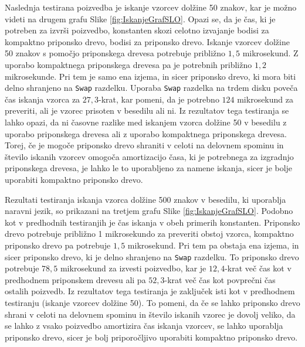 Naslednja testirana poizvedba je iskanje vzorcev dolžine 50 znakov, kar je možno videti na drugem grafu Slike \ref{fig:IskanjeGrafSLO}. Opazi se, da je čas, ki je potreben za izvrši poizvedbo, konstanten skozi celotno izvajanje bodisi za kompaktno priponsko drevo, bodisi za priponsko drevo. Iskanje vzorcev dolžine 50 znakov s pomočjo priponskega drevesa potrebuje približno $1,5$ mikrosekund. Z uporabo kompaktnega priponskega drevesa pa je potrebnih približno $1,2$ mikrosekunde. Pri tem je samo ena izjema, in sicer priponsko drevo, ki mora biti delno shranjeno na \verb|Swap| razdelku. Uporaba \verb|Swap| razdelka na trdem disku poveča čas iskanja vzorca za $27,3$-krat, kar pomeni, da je potrebno $124$ mikrosekund za preveriti, ali je vzorec prisoten v besedilu ali ni. Iz rezultatov tega testiranja se lahko opazi, da ni časovne razlike med iskanjem vzorca dolžine 50 v besedilu z uporabo priponskega drevesa ali z uporabo kompaktnega priponskega drevesa. Torej, če je mogoče priponsko drevo shraniti v celoti na delovnem spominu in število iskanih vzorcev omogoča amortizacijo časa, ki je potrebnega za izgradnjo priponskega drevesa, je lahko le to uporabljeno za namene iskanja, sicer je bolje uporabiti kompaktno priponsko drevo.

Rezultati testiranja iskanja vzorca dolžine 500 znakov v besedilu, ki uporablja naravni jezik, so prikazani na tretjem grafu Slike \ref{fig:IskanjeGrafSLO}. Podobno kot v predhodnih testiranjih je čas iskanja v obeh primerih konstanten. Priponsko drevo potrebuje približno 1 mikrosekundo za preveriti obstoj vzorca, kompaktno priponsko drevo pa potrebuje $1,5$ mikrosekund. Pri tem pa obstaja ena izjema, in sicer priponsko drevo, ki je delno shranjeno na \verb|Swap| razdelku. To priponsko drevo potrebuje $78,5$ mikrosekund za izvesti poizvedbo, kar je $12,4$-krat več čas kot v predhodnem priponskem drevesu ali pa $52,3$-krat več čas kot povprečni čas ostalih poizvedb. Iz rezultatov tega testiranja je zaključek isti kot v predhodnem testiranju (iskanje vzorcev dolžine 50). To pomeni, da če se lahko priponsko drevo shrani v celoti na delovnem spominu in število iskanih vzorec je dovolj veliko, da se lahko z vsako poizvedbo amortizira čas iskanja vzorcev, se lahko uporablja priponsko drevo, sicer je bolj priporočljivo uporabiti kompaktno priponsko drevo.

